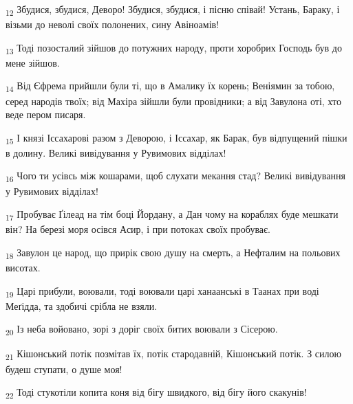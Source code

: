 \begin{tcolorbox}
\textsubscript{12} Збудися, збудися, Деворо! Збудися, збудися, і пісню співай! Устань, Бараку, і візьми до неволі своїх полонених, сину Авіноамів!
\end{tcolorbox}
\begin{tcolorbox}
\textsubscript{13} Тоді позосталий зійшов до потужних народу, проти хоробрих Господь був до мене зійшов.
\end{tcolorbox}
\begin{tcolorbox}
\textsubscript{14} Від Єфрема прийшли були ті, що в Амалику їх корень; Веніямин за тобою, серед народів твоїх; від Махіра зійшли були провідники; а від Завулона оті, хто веде пером писаря.
\end{tcolorbox}
\begin{tcolorbox}
\textsubscript{15} І князі Іссахарові разом з Деворою, і Іссахар, як Барак, був відпущений пішки в долину. Великі вивідування у Рувимових відділах!
\end{tcolorbox}
\begin{tcolorbox}
\textsubscript{16} Чого ти усівсь між кошарами, щоб слухати мекання стад? Великі вивідування у Рувимових відділах!
\end{tcolorbox}
\begin{tcolorbox}
\textsubscript{17} Пробуває Ґілеад на тім боці Йордану, а Дан чому на кораблях буде мешкати він? На березі моря осівся Асир, і при потоках своїх пробуває.
\end{tcolorbox}
\begin{tcolorbox}
\textsubscript{18} Завулон це народ, що прирік свою душу на смерть, а Нефталим на польових висотах.
\end{tcolorbox}
\begin{tcolorbox}
\textsubscript{19} Царі прибули, воювали, тоді воювали царі ханаанські в Таанах при воді Меґідда, та здобичі срібла не взяли.
\end{tcolorbox}
\begin{tcolorbox}
\textsubscript{20} Із неба войовано, зорі з доріг своїх битих воювали з Сісерою.
\end{tcolorbox}
\begin{tcolorbox}
\textsubscript{21} Кішонський потік позмітав їх, потік стародавній, Кішонський потік. З силою будеш ступати, о душе моя!
\end{tcolorbox}
\begin{tcolorbox}
\textsubscript{22} Тоді стукотіли копита коня від бігу швидкого, від бігу його скакунів!
\end{tcolorbox}
